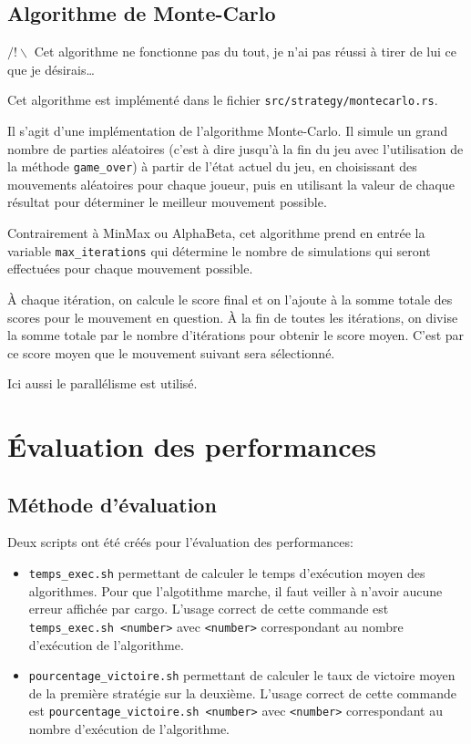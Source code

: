 \documentclass[10pt]{article}
\begin{document}
\subsection{Algorithme de Monte-Carlo}

\color{red}

\( /!\backslash \) Cet algorithme ne fonctionne pas du tout, je n'ai pas réussi à tirer de lui ce que je désirais\dots\
\\

\color{black}

Cet algorithme est implémenté dans le fichier \verb|src/strategy/montecarlo.rs|.

Il s'agit d'une implémentation de l'algorithme Monte-Carlo. Il simule un grand nombre de parties aléatoires (c'est à dire jusqu'à la fin du jeu avec l'utilisation de la méthode \verb|game_over|) à partir de l'état actuel du jeu, en choisissant des mouvements aléatoires pour chaque joueur, puis en utilisant la valeur de chaque résultat pour déterminer le meilleur mouvement possible.

Contrairement à MinMax ou AlphaBeta, cet algorithme prend en entrée la variable \verb|max_iterations| qui détermine le nombre de simulations qui seront effectuées pour chaque mouvement possible.

À chaque itération, on calcule le score final et on l'ajoute à la somme totale des scores pour le mouvement en question. À la fin de toutes les itérations, on divise la somme totale par le nombre d'itérations pour obtenir le score moyen. C'est par ce score moyen que le mouvement suivant sera sélectionné.

Ici aussi le parallélisme est utilisé.

\newpage

\section{Évaluation des performances}
\label{section 2}

\subsection{Méthode d'évaluation}

Deux scripts ont été créés pour l'évaluation des performances:

\begin{itemize}
    \item \verb|temps_exec.sh| permettant de calculer le temps d'exécution moyen des algorithmes. Pour que l'algotithme marche, il faut veiller à n'avoir aucune erreur affichée par cargo. L'usage correct de cette commande est \verb|temps_exec.sh <number>| avec \verb|<number>| correspondant au nombre d'exécution de l'algorithme.
    \item \verb|pourcentage_victoire.sh| permettant de calculer le taux de victoire moyen de la première stratégie sur la deuxième. L'usage correct de cette commande est \verb|pourcentage_victoire.sh <number>| avec \verb|<number>| correspondant au nombre d'exécution de l'algorithme. \\
\end{itemize}
\end{document}

